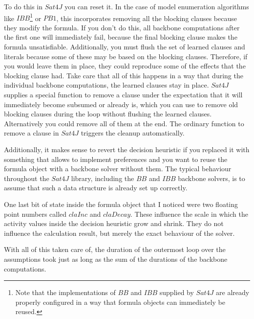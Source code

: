 To do this in $Sat4J$ you can reset it. In the case of model enumeration algorithms like $IBB$\footnote{
	Note that the implementations of $BB$ and $IBB$ supplied by $Sat4J$ are already properly configured in a way that formula objects can immediately be reused.
} or $PB1$, this incorporates removing all the blocking clauses because they modify the formula. If you don't do this, all backbone computations after the first one will immediately fail, because the final blocking clause makes the formula unsatisfiable. Additionally, you must flush the set of learned clauses and literals because some of these may be based on the blocking clauses. Therefore, if you would leave them in place, they could reproduce some of the effects that the blocking clause had. Take care that all of this happens in a way that during the individual backbone computations, the learned clauses stay in place. $Sat4J$ supplies a special function to remove a clause under the expectation that it will immediately become subsumed or already is, which you can use to remove old blocking clauses during the loop without flushing the learned clauses. Alternatively you could remove all of them at the end. The ordinary function to remove a clause in $Sat4J$ triggers the cleanup automatically. 

Additionally, it makes sense to revert the decision heuristic if you replaced it with something that allows to implement preferences and you want to reuse the formula object with a backbone solver without them. The typical behaviour throughout the $Sat4J$ library, including the $BB$ and $IBB$ backbone solvers, is to assume that such a data structure is already set up correctly.

One last bit of state inside the formula object that I noticed were two floating point numbers called $claInc$ and $claDecay$. These influence the scale in which the activity values inside the decision heuristic grow and shrink. They do not influence the calculation result, but merely the exact behaviour of the solver.

With all of this taken care of, the duration of the outermost loop over the assumptions took just as long as the sum of the durations of the backbone computations.



